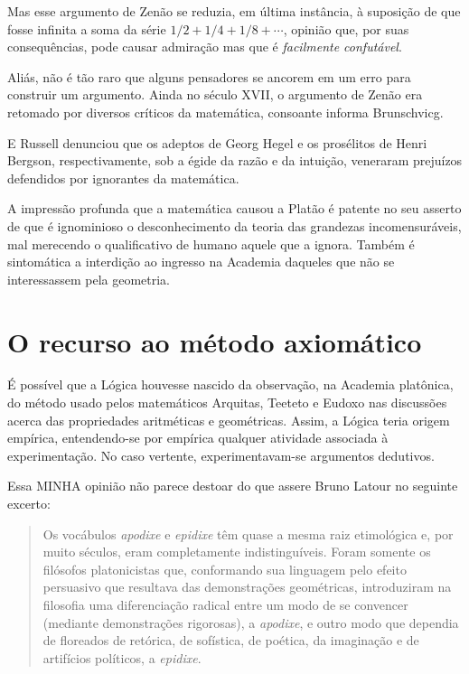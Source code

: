 \documentclass{hipatia}
\begin{document}
Mas esse argumento de Zenão se reduzia, em última instância, à suposição de que fosse infinita a soma da série $1/2 + 1/4 + 1/8 + \cdots$, opinião que, por suas consequências, pode causar admiração mas que é \emph{facilmente confutável}. 

Aliás, não é tão raro que alguns pensadores se ancorem em um erro para construir um argumento. Ainda no século XVII, o argumento de Zenão era retomado por diversos críticos da matemática, consoante informa Brunschvicg.  \cite[p. 154]{brunschvicg1972}  

E Russell  denunciou que os adeptos de Georg Hegel e os prosélitos de Henri Bergson, respectivamente, sob a égide da razão e da intuição, veneraram prejuízos defendidos por ignorantes da matemática. \cite{russell1945}

A impressão profunda que a matemática causou a Platão é patente no seu asserto de que é ignominioso o desconhecimento da teoria das grandezas incomensuráveis, mal merecendo o qualificativo de humano aquele que a ignora. Também é sintomática a interdição ao ingresso na Academia daqueles que não se interessassem pela geometria. \cite[p. 21]{lanczos1970}\cite[p. 209--210]{russell1945}  


\section{O recurso ao método axiomático}

É possível que a Lógica houvesse nascido da observação, na Academia platônica, do método usado pelos matemáticos Arquitas, Teeteto e Eudoxo nas discussões acerca das propriedades aritméticas e geométricas. Assim, a Lógica teria origem empírica, entendendo-se por empírica qualquer atividade associada à experimentação. No caso vertente, experimentavam-se argumentos dedutivos.

Essa MINHA opinião não parece destoar do que assere Bruno Latour no seguinte excerto:
\begin{quote}
    Os vocábulos \emph{apodixe} e \emph{epidixe} têm quase a mesma raiz etimológica e, por muito séculos, eram completamente indistinguíveis. Foram somente os filósofos platonicistas que, conformando sua linguagem pelo efeito persuasivo que resultava das demonstrações geométricas, introduziram na filosofia uma diferenciação radical entre um modo de se convencer (mediante demonstrações rigorosas), a \emph{apodixe}, e outro modo que dependia de floreados de retórica, de sofística, de poética, da imaginação e de artifícios políticos, a \emph{epidixe}. \cite[p. 445--446]{latour2008}
\end{quote}
\end{document}
